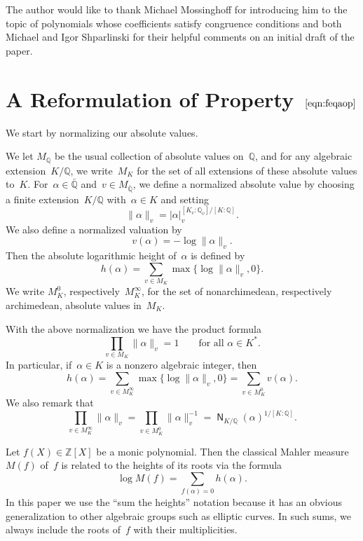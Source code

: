 \begin{acknowledgement}
The author would like to thank Michael Mossinghoff for introducing him
to the topic of polynomials whose coefficients satisfy congruence
conditions and both Michael and Igor Shparlinski for their helpful
comments on an initial draft of the paper.
\end{acknowledgement}

\section{A Reformulation of Property~$\eqref{eqn:feqaop}$}
\label{section:prop1}

We start by normalizing our absolute values.

\begin{definition}
We let $M_{\mathbb{Q}}$ be the usual collection of absolute values on~${\mathbb{Q}}$,
and for any algebraic extension~$K/{\mathbb{Q}}$, we write~$M_K$ for the set of
all extensions of these absolute values to~$K$.  For~${\alpha}\in{{\bar{\mathbb{Q}}}}$
and~$v\in M_{{\bar{\mathbb{Q}}}}$, we define a normalized absolute value by choosing
a finite extension~$K/{\mathbb{Q}}$ with~${\alpha}\in K$ and setting
\[
  \|{\alpha}\|_v = |{\alpha}|_v^{[K_v:{\mathbb{Q}}_v]/[K:{\mathbb{Q}}]}.
\]
We also define a normalized valuation by
\[
  v({\alpha}) = -\log\|{\alpha}\|_v.
\]
Then the absolute logarithmic height of~${\alpha}$ is defined by
\[
  h({\alpha}) = \sum_{v\in M_K} \max\bigl\{\log\|{\alpha}\|_v,0\bigr\}.
\]
We write $M_K^0$, respectively~$M_K^\infty$, for the set of
nonarchimedean, respectively archimedean, absolute values in~$M_K$.
\end{definition}

\begin{remark}
With the above normalization we have the product formula
\[
  \prod_{v\in M_K} \|{\alpha}\|_v = 1\qquad\text{for all ${\alpha}\in K^*$.}
\]
In particular, if~${\alpha}\in K$ is a nonzero algebraic integer, then
\[
  h({\alpha}) = \sum_{v\in M_K^\infty}\max\bigl\{\log\|{\alpha}\|_v,0\bigr\}
    = \sum_{v\in M_K^0} v({\alpha}).
\]
We also remark that
\[
  \prod_{v\in M_K^\infty} \|{\alpha}\|_v
  = \prod_{v\in M_K^0} \|{\alpha}\|_v^{-1} = {{\operatorname{\mathsf{N}}}}_{K/{\mathbb{Q}}}({\alpha})^{1/[K:{\mathbb{Q}}]}.
\]
\end{remark}

\begin{remark}
Let $f(X)\in{\mathbb{Z}}[X]$ be a monic polynomial. Then the classical Mahler
measure~$M(f)$ of~$f$ is related to the heights of its roots via the
formula
\[
  \log M(f) = \sum_{f({\alpha})=0} h({\alpha}).
\]
In this paper we use the ``sum the heights'' notation because it has
an obvious generalization to other algebraic groups such as elliptic
curves. In such sums, we always include the roots of~$f$ with their
multiplicities.
\end{remark}

